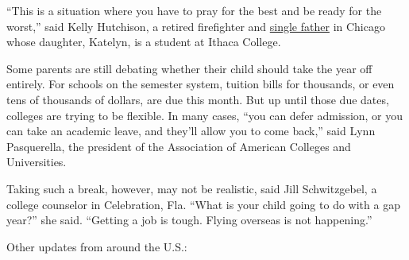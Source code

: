 ``This is a situation where you have to pray for the best and be ready
for the worst,'' said Kelly Hutchison, a retired firefighter and
\href{https://books.apple.com/us/book/book-title/id1291492202?ls=1}{single
father} in Chicago whose daughter, Katelyn, is a student at Ithaca
College.

Some parents are still debating whether their child should take the year
off entirely. For schools on the semester system, tuition bills for
thousands, or even tens of thousands of dollars, are due this month. But
up until those due dates, colleges are trying to be flexible. In many
cases, ``you can defer admission, or you can take an academic leave, and
they'll allow you to come back,'' said Lynn Pasquerella, the president
of the Association of American Colleges and Universities.

Taking such a break, however, may not be realistic, said Jill
Schwitzgebel, a college counselor in Celebration, Fla. ``What is your
child going to do with a gap year?'' she said. ``Getting a job is tough.
Flying overseas is not happening.''

Other updates from around the U.S.:

